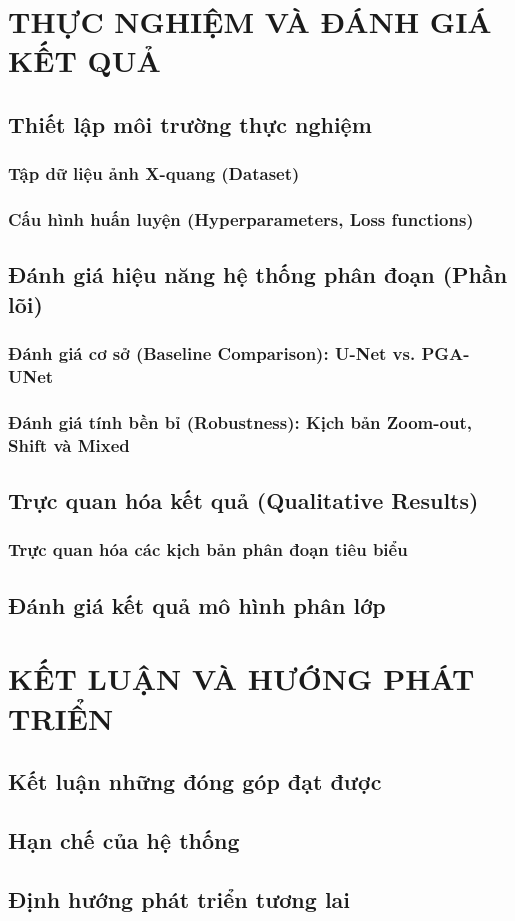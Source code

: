 \documentclass[a4paper,12pt,oneside]{report}
\begin{document}
\chapter{THỰC NGHIỆM VÀ ĐÁNH GIÁ KẾT QUẢ}
\section{Thiết lập môi trường thực nghiệm}
\subsection{Tập dữ liệu ảnh X-quang (Dataset)}
\subsection{Cấu hình huấn luyện (Hyperparameters, Loss functions)}
\section{Đánh giá hiệu năng hệ thống phân đoạn (Phần lõi)}
\subsection{Đánh giá cơ sở (Baseline Comparison): U-Net vs. PGA-UNet}
\subsection{Đánh giá tính bền bỉ (Robustness): Kịch bản Zoom-out, Shift và Mixed}
\section{Trực quan hóa kết quả (Qualitative Results)}
\subsection{Trực quan hóa các kịch bản phân đoạn tiêu biểu}
\section{Đánh giá kết quả mô hình phân lớp}

\chapter{KẾT LUẬN VÀ HƯỚNG PHÁT TRIỂN}
\section{Kết luận những đóng góp đạt được}
\section{Hạn chế của hệ thống}
\section{Định hướng phát triển tương lai}
\end{document}
